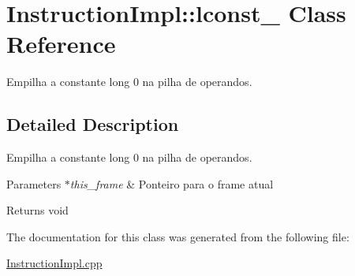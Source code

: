 \hypertarget{class_instruction_impl_1_1lconst__0}{}\section{Instruction\+Impl\+:\+:lconst\+\_ Class Reference}
\label{class_instruction_impl_1_1lconst__0}


Empilha a constante long 0 na pilha de operandos.  




\subsection{Detailed Description}
Empilha a constante long 0 na pilha de operandos. 


\begin{DoxyParams}{Parameters}
{\em $\ast$this\+\_\+frame} & Ponteiro para o frame atual \\
\hline
\end{DoxyParams}
\begin{DoxyReturn}{Returns}
void 
\end{DoxyReturn}


The documentation for this class was generated from the following file\+:\begin{DoxyCompactItemize}
\item 
\hyperlink{_instruction_impl_8cpp}{Instruction\+Impl.\+cpp}\end{DoxyCompactItemize}
